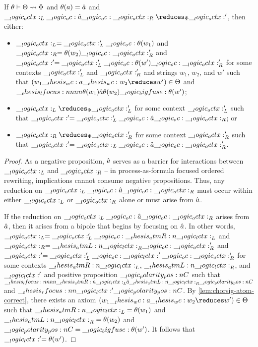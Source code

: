 \begin{theorem}\label{thm:formula-as-process:choreograph-soundness}
  If $\theta \vdash \Theta \rightsquigarrow \Phi$ and $\theta(a) = \hat{a}$ and $\octx_L \oc \defp{a} \oc \octx_R \reduces_{\orsig} \octx'$, then either:
  \begin{itemize}
  \item $\__logic_octx:_L = \__logic_octx:'_L \__logic_oc: \theta(w_1)$ and $\__logic_octx:_R = \theta(w_2) \__logic_oc: \__logic_octx:'_R$ and $\__logic_octx:' = \__logic_octx:'_L \__logic_oc: \theta(w') \__logic_oc: \__logic_octx:'_R$ for some contexts $\__logic_octx:'_L$ and $\__logic_octx:'_R$ and strings $w_1$, $w_2$, and $w'$ such that $(w_1 \wc a \wc w_2 \reduces w') \in \srsig$ and $\__thesis_lfocus:nnnn {\theta(w_1)} {\hat{a}} {\theta(w_2)} {\__logic_bigfuse: \theta(w')}$;
  \item $\octx_L \reduces_{\orsig} \octx'_L$ for some context $\__logic_octx:'_L$ such that $\__logic_octx:' = \__logic_octx:'_L \__logic_oc: \hat{a} \__logic_oc: \__logic_octx:_R$; or
  \item $\octx_R \reduces_{\orsig} \octx'_R$ for some context $\__logic_octx:'_R$ such that $\__logic_octx:' = \__logic_octx:_L \__logic_oc: \hat{a} \__logic_oc: \__logic_octx:'_R$.
  \end{itemize}
\end{theorem}
\begin{proof}
  As a negative proposition, $\hat{a}$ serves as a barrier for interactions between $\__logic_octx:_L$ and $\__logic_octx:_R$ -- in process-as-formula focused ordered rewriting, implications cannot consume negative propositions.
  Thus, any reduction on $\__logic_octx:_L \__logic_oc: \hat{a} \__logic_oc: \__logic_octx:_R$ must occur within either $\__logic_octx:_L$ or $\__logic_octx:_R$ alone or must arise from $\hat{a}$.

  If the reduction on $\__logic_octx:_L \__logic_oc: \hat{a} \__logic_oc: \__logic_octx:_R$ arises from $\hat{a}$, then it arises from a bipole that begins by focusing on $\hat{a}$.
  In other words, $\__logic_octx:_L = \__logic_octx:'_L \__logic_oc: \__thesis_atmR:n {\__logic_lctx:}_L$ and $\__logic_octx:_R = \__thesis_atmL:n {\__logic_lctx:}_R \__logic_oc: \__logic_octx:'_R$ and $\__logic_octx:' = \__logic_octx:'_L \__logic_oc: \__logic_lctx:' \__logic_oc: \__logic_octx:'_R$ for some contexts $\__thesis_atmR:n {\__logic_lctx:}_L$, $\__thesis_atmL:n {\__logic_lctx:}_R$, and $\__logic_lctx:'$ and positive proposition $\__logic_polarity_pos:n {C}$ such that $\__thesis_lfocus:nnnn {\__thesis_atmR:n {\__logic_lctx:}_L} {\hat{a}} {\__thesis_atmL:n {\__logic_lctx:}_R} {\__logic_polarity_pos:n {C}}$ and $\__thesis_rfocus:nn {\__logic_lctx:'} {\__logic_polarity_pos:n {C}}$.
  By \cref{lem:chorsig-atom-correct}, there exists an axiom $(w_1 \wc a \wc w_2 \reduces w') \in \srsig$ such that $\__thesis_atmR:n {\__logic_lctx:}_L = \theta(w_1)$ and $\__thesis_atmL:n {\__logic_lctx:}_R = \theta(w_2)$ and $\__logic_polarity_pos:n {C} = \__logic_bigfuse: \theta(w')$.
  It follows that $\__logic_lctx:' = \theta(w')$.
\end{proof}

